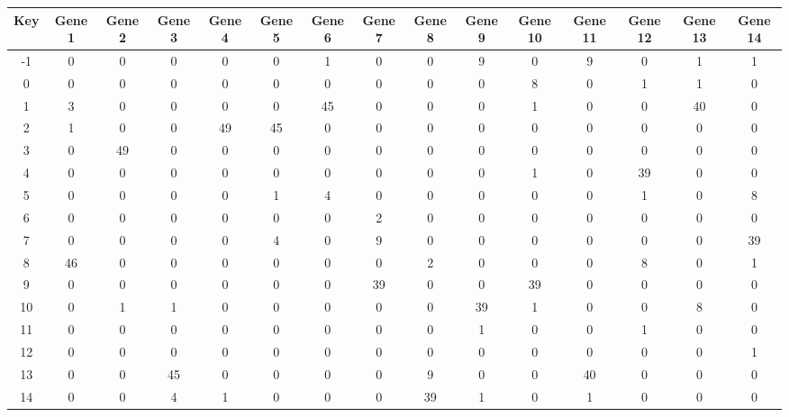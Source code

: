 \begin{tabular}{|c|c|c|c|c|c|c|c|c|c|c|c|c|c|c|}
\hline
Key & Gene 1 & Gene 2 & Gene 3 & Gene 4 & Gene 5 & Gene 6 & Gene 7 & Gene 8 & Gene 9 & Gene 10 & Gene 11 & Gene 12 & Gene 13 & Gene 14 \\
\hline
-1 & 0 & 0 & 0 & 0 & 0 & 1 & 0 & 0 & 9 & 0 & 9 & 0 & 1 & 1 \\
0 & 0 & 0 & 0 & 0 & 0 & 0 & 0 & 0 & 0 & 8 & 0 & 1 & 1 & 0 \\
1 & 3 & 0 & 0 & 0 & 0 & 45 & 0 & 0 & 0 & 1 & 0 & 0 & 40 & 0 \\
2 & 1 & 0 & 0 & 49 & 45 & 0 & 0 & 0 & 0 & 0 & 0 & 0 & 0 & 0 \\
3 & 0 & 49 & 0 & 0 & 0 & 0 & 0 & 0 & 0 & 0 & 0 & 0 & 0 & 0 \\
4 & 0 & 0 & 0 & 0 & 0 & 0 & 0 & 0 & 0 & 1 & 0 & 39 & 0 & 0 \\
5 & 0 & 0 & 0 & 0 & 1 & 4 & 0 & 0 & 0 & 0 & 0 & 1 & 0 & 8 \\
6 & 0 & 0 & 0 & 0 & 0 & 0 & 2 & 0 & 0 & 0 & 0 & 0 & 0 & 0 \\
7 & 0 & 0 & 0 & 0 & 4 & 0 & 9 & 0 & 0 & 0 & 0 & 0 & 0 & 39 \\
8 & 46 & 0 & 0 & 0 & 0 & 0 & 0 & 2 & 0 & 0 & 0 & 8 & 0 & 1 \\
9 & 0 & 0 & 0 & 0 & 0 & 0 & 39 & 0 & 0 & 39 & 0 & 0 & 0 & 0 \\
10 & 0 & 1 & 1 & 0 & 0 & 0 & 0 & 0 & 39 & 1 & 0 & 0 & 8 & 0 \\
11 & 0 & 0 & 0 & 0 & 0 & 0 & 0 & 0 & 1 & 0 & 0 & 1 & 0 & 0 \\
12 & 0 & 0 & 0 & 0 & 0 & 0 & 0 & 0 & 0 & 0 & 0 & 0 & 0 & 1 \\
13 & 0 & 0 & 45 & 0 & 0 & 0 & 0 & 9 & 0 & 0 & 40 & 0 & 0 & 0 \\
14 & 0 & 0 & 4 & 1 & 0 & 0 & 0 & 39 & 1 & 0 & 1 & 0 & 0 & 0 \\
\hline
\end{tabular}